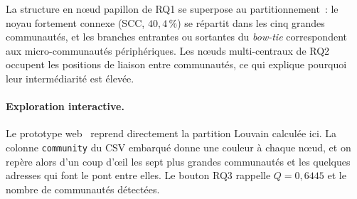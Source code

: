La structure en n\oe{}ud papillon de RQ1 se superpose au partitionnement~: le noyau fortement connexe (SCC, $40{,}4\,\%$) se r\'epartit dans les cinq grandes communaut\'es, et les branches entrantes ou sortantes du \textit{bow-tie} correspondent aux micro-communaut\'es p\'eriph\'eriques. Les n\oe{}uds multi-centraux de RQ2 occupent les positions de liaison entre communaut\'es, ce qui explique pourquoi leur interm\'ediarit\'e est \'elev\'ee.

\paragraph{Exploration interactive.}
Le prototype web~\cite{cryptographexplorer_web} reprend directement la
partition Louvain calcul\'ee ici. La colonne \texttt{community} du CSV
embarqu\'e donne une couleur \`a chaque n\oe{}ud, et on rep\`ere alors
d'un coup d'\oe{}il les sept plus grandes communaut\'es et les quelques
adresses qui font le pont entre elles. Le bouton \og RQ3 \fg{} rappelle
$Q = 0{,}6445$ et le nombre de communaut\'es d\'etect\'ees.
